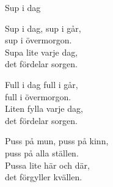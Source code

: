 \begin{song}{Sup i dag}
	
	
	
	Sup i dag, sup i går,\\
	sup i övermorgon.\\
	Supa lite varje dag,\\
	det fördelar sorgen.
	
	Full i dag full i går,\\
	full i övermorgon.\\
	Liten fylla varje dag,\\
	det fördelar sorgen.
	
	Puss på mun, puss på kinn,\\
	puss på alla ställen.\\
	Pussa lite här och där,\\
	det förgyller kvällen.
	
\end{song}
